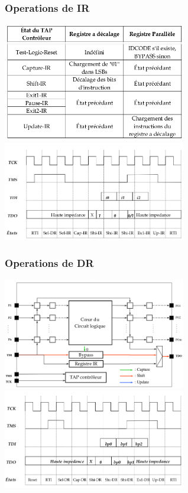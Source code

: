 \documentclass[10pt]{article}
\begin{document}
\begin{multicols}{2}
  \subsubsection{Operations de IR}
  \includegraphics[width=8cm]{jtag_3.png}\\
  \includegraphics[width=8cm]{jtag_4.png}
  \subsubsection{Operations de DR}
  \includegraphics[width=8cm]{jtag_5.png}\\
  \includegraphics[width=8cm]{jtag_6.png}
  \newpage

\end{multicols}
\end{document}
